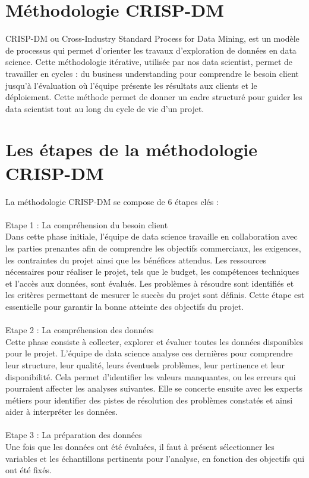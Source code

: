 \section{Méthodologie CRISP-DM}
CRISP-DM ou Cross-Industry Standard Process for Data Mining, est un modèle de processus qui permet d’orienter les travaux d’exploration de données en data science. 
Cette méthodologie itérative, utilisée par nos data scientist, permet de travailler en cycles : du business understanding pour comprendre le besoin client jusqu’à l’évaluation où l’équipe présente les résultats aux clients et le déploiement. Cette méthode permet de donner un cadre structuré pour guider les data scientist tout au long du cycle de vie d’un projet.
\section{Les étapes de la méthodologie CRISP-DM}
La méthodologie CRISP-DM se compose de 6 étapes clés : 
\\
\\
Etape 1 : La compréhension du besoin client
\\
‍Dans cette phase initiale, l’équipe de data science travaille en collaboration avec les parties prenantes afin de comprendre les objectifs commerciaux, les exigences, les contraintes du projet ainsi que les bénéfices attendus.
Les ressources nécessaires pour réaliser le projet, tels que le budget, les compétences techniques et l'accès aux données, sont évalués. Les problèmes à résoudre sont identifiés et les critères permettant de mesurer le succès du projet sont définis.
Cette étape est essentielle pour garantir la bonne atteinte des objectifs du projet.
\\
\\
‍Etape 2 : La compréhension des données
\\
‍Cette phase consiste à collecter, explorer et évaluer toutes les données disponibles pour le projet. L'équipe de data science analyse ces dernières pour comprendre leur structure, leur qualité, leurs éventuels problèmes, leur pertinence et leur disponibilité. 
Cela permet d’identifier les valeurs manquantes, ou les erreurs qui pourraient affecter les analyses suivantes. Elle se concerte ensuite avec les experts métiers pour identifier des pistes de résolution des problèmes constatés et ainsi aider à interpréter les données.
\\
\\
‍Etape 3 : La préparation des données
\\
‍Une fois que les données ont été évaluées, il faut à présent sélectionner les variables et les échantillons pertinents pour l’analyse, en fonction des objectifs qui ont été fixés.
